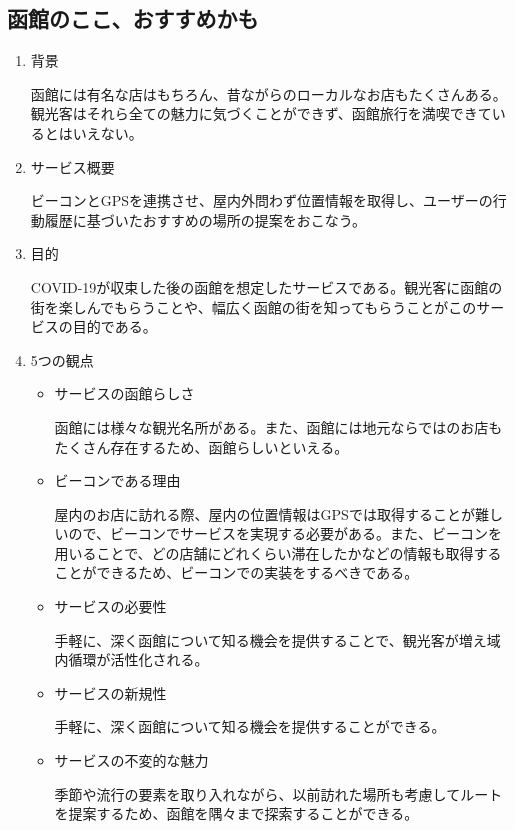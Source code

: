 \subsection{函館のここ、おすすめかも}
\begin{enumerate}
    \item 背景
    \par 函館には有名な店はもちろん、昔ながらのローカルなお店もたくさんある。観光客はそれら全ての魅力に気づくことができず、函館旅行を満喫できているとはいえない。
    \item サービス概要
    \par ビーコンとGPSを連携させ、屋内外問わず位置情報を取得し、ユーザーの行動履歴に基づいたおすすめの場所の提案をおこなう。
    \item 目的
    \par COVID-19が収束した後の函館を想定したサービスである。観光客に函館の街を楽しんでもらうことや、幅広く函館の街を知ってもらうことがこのサービスの目的である。
    \item 5つの観点
    \begin{itemize}
        \item サービスの函館らしさ
        \par 函館には様々な観光名所がある。また、函館には地元ならではのお店もたくさん存在するため、函館らしいといえる。
        \item ビーコンである理由
        \par 屋内のお店に訪れる際、屋内の位置情報はGPSでは取得することが難しいので、ビーコンでサービスを実現する必要がある。また、ビーコンを用いることで、どの店舗にどれくらい滞在したかなどの情報も取得することができるため、ビーコンでの実装をするべきである。
        \item サービスの必要性
        \par 手軽に、深く函館について知る機会を提供することで、観光客が増え域内循環が活性化される。
        \item サービスの新規性
        \par 手軽に、深く函館について知る機会を提供することができる。
        \item サービスの不変的な魅力
        \par 季節や流行の要素を取り入れながら、以前訪れた場所も考慮してルートを提案するため、函館を隅々まで探索することができる。
    \end{itemize}
\end{enumerate}

